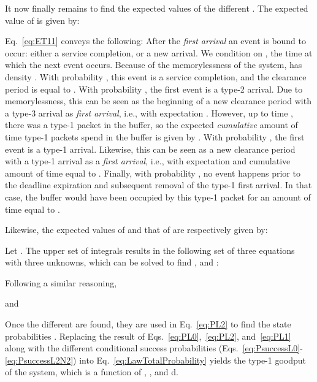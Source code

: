 \documentclass[preprint,12pt]{elsarticle}
\theoremstyle{definition}
\theoremstyle{plain}
\theoremstyle{remark}
\begin{document}
It now finally remains to find the expected values of the different . The expected value of  is given by:

Eq.~\eqref{eq:ET11} conveys the following: After the \emph{first arrival} an event is bound to occur: either a service completion, or a new arrival. We condition on , the time at which the next event occurs. Because of the memorylessness of the system,  has density . With probability , this event is a service completion, and the clearance period is equal to . With probability , the first event is a type-2 arrival. Due to memorylessness, this can be seen as the beginning of a new clearance period with a type-3 arrival as \emph{first arrival}, i.e., with expectation . However, up to time , there was a type-1 packet in the buffer, so the expected \emph{cumulative} amount of time type-1 packets spend in the buffer is given by . With probability , the first event is a type-1 arrival. Likewise, this can be seen as a new clearance period with a type-1 arrival as a \emph{first arrival}, i.e., with expectation  and cumulative amount of time equal to . Finally, with probability , no event happens prior to the deadline expiration and subsequent removal of the type-1 first arrival. In that case, the buffer would have been occupied by this type-1 packet for an amount of time equal to .

Likewise, the expected values of  and that of  are respectively given by:

    

    


   Let . The upper set of integrals results in the following set of three equations with three unknowns, which can be solved to find ,  and :

    

    

    


    Following a similar reasoning,

    

    

    

 and

     

    

    


Once the different  are found, they are used in Eq.~\eqref{eq:PL2} to find the state probabilities . Replacing the result of Eqs.~\eqref{eq:PL0},~\eqref{eq:PL2}, and~\eqref{eq:PL1} along with the different conditional success probabilities (Eqs.~\eqref{eq:PsuccessL0}-\eqref{eq:PsuccessL2N2}) into Eq.~\eqref{eq:LawTotalProbability} yields the type-1 goodput of the system, which is a function of , ,  and d. 
\end{document}
